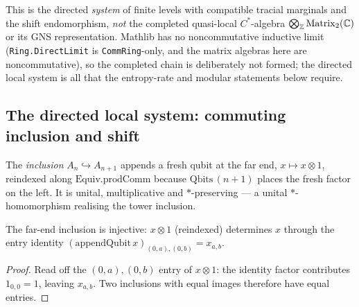 \begin{remark}\label{qbs-scope-directed}
  This is the directed \emph{system} of finite levels with compatible tracial marginals and the shift
  endomorphism, \emph{not} the completed quasi-local \(C^{*}\)-algebra
  \(\bigotimes_{\mathbb{Z}}\operatorname{Matrix}_2(\mathbb{C})\) or its GNS representation. Mathlib has no noncommutative
  inductive limit (\texttt{Ring.DirectLimit} is \texttt{CommRing}-only, and the matrix algebras here
  are noncommutative), so the completed chain is deliberately not formed; the directed local system
  is all that the entropy-rate and modular statements below require.
\end{remark}

\subsection{The directed local system: commuting inclusion and shift}

\begin{definition}\label{appendQubit}
  \leanok
  The \emph{inclusion} \(A_n\hookrightarrow A_{n+1}\) appends a fresh qubit at the far end,
  \(x\mapsto x\otimes 1\), reindexed along \(\mathrm{Equiv.prodComm}\) because \(\mathrm{Qbits}\,(n+1)\)
  places the fresh factor on the left. It is unital, multiplicative and \(*\)-preserving --- a unital
  \(*\)-homomorphism realising the tower inclusion.
\end{definition}

\begin{lemma}\label{appendQubit_injective}
  \leanok
  The far-end inclusion is injective: \(x\otimes 1\) (reindexed) determines \(x\) through the entry
  identity \((\mathrm{appendQubit}\,x)_{(0,a),(0,b)} = x_{a,b}\).
\end{lemma}
\begin{proof}\leanok
  Read off the \((0,a),(0,b)\) entry of \(x\otimes 1\): the identity factor contributes
  \(1_{0,0}=1\), leaving \(x_{a,b}\). Two inclusions with equal images therefore have equal entries.
\end{proof}

